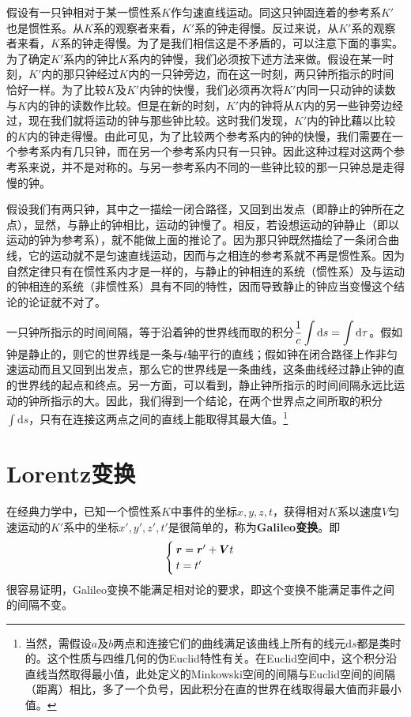假设有一只钟相对于某一惯性系$K$作匀速直线运动。同这只钟固连着的参考系$K'$也是惯性系。从$K$系的观察者来看，$K'$系的钟走得慢。反过来说，从$K'$系的观察者来看，$K$系的钟走得慢。为了是我们相信这是不矛盾的，可以注意下面的事实。为了确定$K'$系内的钟比$K$系内的钟慢，我们必须按下述方法来做。假设在某一时刻，$K'$内的那只钟经过$K$内的一只钟旁边，而在这一时刻，两只钟所指示的时间恰好一样。为了比较$K$及$K'$内钟的快慢，我们必须再次将$K'$内同一只动钟的读数与$K$内的钟的读数作比较。但是在新的时刻，$K'$内的钟将从$K$内的另一些钟旁边经过，现在我们就将运动的钟与那些钟比较。这时我们发现，$K'$内的钟比藉以比较的$K$内的钟走得慢。由此可见，为了比较两个参考系内的钟的快慢，我们需要在一个参考系内有几只钟，而在另一个参考系内只有一只钟。因此这种过程对这两个参考系来说，并不是对称的。与另一参考系内不同的一些钟比较的那一只钟总是走得慢的钟。

假设我们有两只钟，其中之一描绘一闭合路径，又回到出发点（即静止的钟所在之点），显然，与静止的钟相比，运动的钟慢了。相反，若设想运动的钟静止（即以运动的钟为参考系），就不能做上面的推论了。因为那只钟既然描绘了一条闭合曲线，它的运动就不是匀速直线运动，因而与之相连的参考系就不再是惯性系。因为自然定律只有在惯性系内才是一样的，与静止的钟相连的系统（惯性系）及与运动的钟相连的系统（非惯性系）具有不同的特性，因而导致静止的钟应当变慢这个结论的论证就不对了。

一只钟所指示的时间间隔，等于沿着钟的世界线而取的积分$\displaystyle \dfrac{1}{c}\int\mathrm{d}s = \int \mathrm{d} \tau$。假如钟是静止的，则它的世界线是一条与$t$轴平行的直线；假如钟在闭合路径上作非匀速运动而且又回到出发点，那么它的世界线是一条曲线，这条曲线经过静止钟的直的世界线的起点和终点。另一方面，可以看到，静止钟所指示的时间间隔永远比运动的钟所指示的大。因此，我们得到一个结论，在两个世界点之间所取的积分$\displaystyle \int\mathrm{d}s$，只有在连接这两点之间的直线上能取得其最大值。\footnote{当然，需假设$a$及$b$两点和连接它们的曲线满足该曲线上所有的线元$\mathrm{d}s$都是类时的。这个性质与四维几何的伪Euclid特性有关。在Euclid空间中，这个积分沿直线当然取得最小值，此处定义的Minkowski空间的间隔与Euclid空间的间隔（距离）相比，多了一个负号，因此积分在直的世界在线取得最大值而非最小值。}

\section{Lorentz变换}

在经典力学中，已知一个惯性系$K$中事件的坐标$x,y,z,t$，获得相对$K$系以速度$V$匀速运动的$K'$系中的坐标$x',y',z',t'$是很简单的，称为{\bf Galileo变换}。即
\begin{equation}
\begin{cases}
	\boldsymbol{r} = \boldsymbol{r}'+\boldsymbol{V}t \\
	t = t'
\end{cases}
\end{equation}
很容易证明，Galileo变换不能满足相对论的要求，即这个变换不能满足事件之间的间隔不变。

